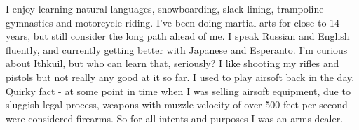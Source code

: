 \begin{cvletter}

I enjoy learning natural languages, snowboarding, slack-lining, trampoline gymnastics and motorcycle riding. I've been doing martial arts for close to 14 years, but still consider the long path ahead of me. I speak Russian and English fluently, and currently getting better with Japanese and Esperanto. I'm curious about Ithkuil, but who can learn that, seriously? I like shooting my rifles and pistols but not really any good at it so far. I used to play airsoft back in the day. Quirky fact - at some point in time when I was selling airsoft equipment, due to sluggish legal process, weapons with muzzle velocity of over 500 feet per second were considered firearms. So for all intents and purposes I was an arms dealer.

\end{cvletter}